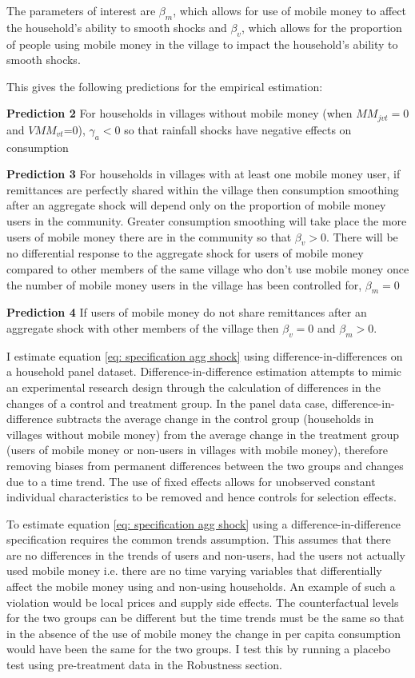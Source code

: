 The parameters of interest are $\beta_m $,  which allows for use of mobile money to affect the household's ability to smooth shocks and $\beta_v$, which allows for the proportion of people using mobile money in the village to impact the household's ability to smooth shocks.

This gives the following predictions for the empirical estimation:
\begin{description}
\item{\bf{Prediction 2}} For households in villages without mobile money (when $MM_{jvt}=0$ and $VMM_{vt}$=0), $\gamma_a<0$ so that rainfall shocks have negative effects on consumption
\item{\bf{Prediction 3}} For households in villages with at least one mobile money user, if remittances are perfectly shared within the village then consumption smoothing after an aggregate shock will depend only on the proportion of mobile money users in the community. Greater consumption smoothing will take place the more users of mobile money there are in the community so that $\beta_v >0$. There will be no 
differential response to the aggregate shock for users of mobile money compared to other members of the same village who don't use mobile money once the number of mobile money users in the village has been controlled for, $\beta_m=0$
\item{\bf{Prediction 4}} If users of mobile money do not share remittances after an aggregate shock with other members of the village then $\beta_v=0$ and $\beta_m>0$. 
\end{description}

I estimate equation \eqref{eq: specification agg shock} using difference-in-differences on a household panel dataset. Difference-in-difference estimation attempts to mimic an experimental research design through the calculation of differences in the changes of a control and treatment group. In the panel data case, difference-in-difference subtracts the average change in the control group (households in villages without mobile money) from the average change in the treatment group (users of mobile money or non-users in villages with mobile money), therefore removing biases from permanent differences between the two groups and changes due to a time trend. The use of fixed effects allows for unobserved constant individual characteristics to be removed and hence controls for selection effects. 

To estimate equation \eqref{eq: specification agg shock} using a difference-in-difference specification requires the common trends assumption. This assumes that there are no differences in the trends of users and non-users, had the users not actually used mobile money i.e. there are no time varying variables that differentially affect the mobile money using and non-using households. An example of such a violation would be local prices and supply side effects. The counterfactual levels for the two groups can be different but the time trends must be the same so that in the absence of the use of mobile money the change in per capita consumption would have been the same for the two groups. I test this by running a placebo test using pre-treatment data in the Robustness section.

